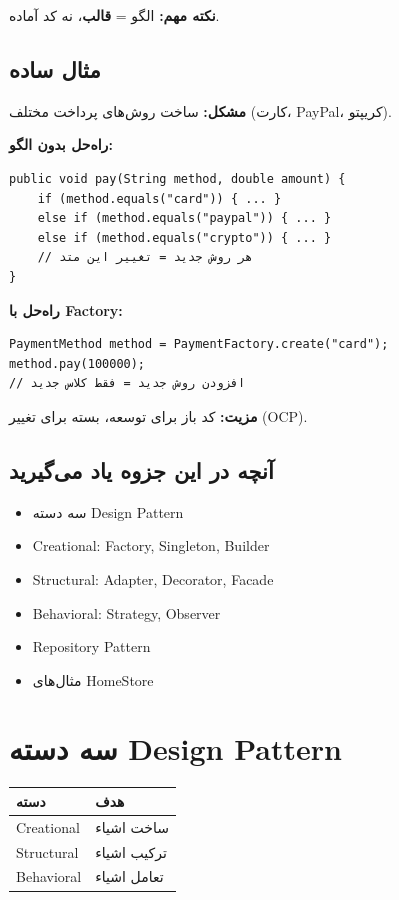 \documentclass[12pt, a4paper]{article}
\begin{document}
\textbf{نکته مهم:} الگو = \textbf{قالب}، نه کد آماده.

\subsection{مثال ساده}

\textbf{مشکل:} ساخت روش‌های پرداخت مختلف (کارت، PayPal، کریپتو).

\textbf{راه‌حل بدون الگو:}
\begin{lstlisting}
public void pay(String method, double amount) {
    if (method.equals("card")) { ... }
    else if (method.equals("paypal")) { ... }
    else if (method.equals("crypto")) { ... }
    // هر روش جدید = تغییر این متد
}
\end{lstlisting}

\textbf{راه‌حل با Factory:}
\begin{lstlisting}
PaymentMethod method = PaymentFactory.create("card");
method.pay(100000);
// افزودن روش جدید = فقط کلاس جدید
\end{lstlisting}

\textbf{مزیت:} کد باز برای توسعه، بسته برای تغییر (OCP).

\subsection{آنچه در این جزوه یاد می‌گیرید}
\begin{itemize}
    \item سه دسته Design Pattern
    \item Creational: Factory, Singleton, Builder
    \item Structural: Adapter, Decorator, Facade
    \item Behavioral: Strategy, Observer
    \item Repository Pattern
    \item مثال‌های HomeStore
\end{itemize}

\section{سه دسته Design Pattern}

\begin{center}
\begin{tabular}{|l|p{9cm}|}
\hline
\textbf{دسته} & \textbf{هدف} \\
\hline
Creational & ساخت اشیاء \\
\hline
Structural & ترکیب اشیاء \\
\hline
Behavioral & تعامل اشیاء \\
\hline
\end{tabular}
\end{center}
\end{document}

